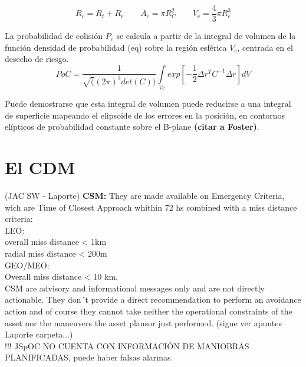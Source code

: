 \begin{equation}
R_{c}=R_{t}+R_{r} \qquad A_{c}=\pi R_{C}^{2} \qquad V_{c}=\frac{4}{3} \pi R_{c}^{3}
\end{equation}

La probabilidad de colisi\'on $P_{c}$ se calcula a partir de la integral de volumen de la funci\'on densidad de probabilidad (eq) sobre la regi\'on esf\'erica $V_{c}$, centrada en el desecho de riesgo.
\begin{equation}
PoC=\frac{1}{\sqrt((2\pi)^3det(C))} \int \limits_{Vc} exp[-\frac{1}{2}\Delta r^TC^{-1}\Delta r]dV
\end{equation}

Puede demostrarse que esta integral de volumen puede reducirse a una integral de superficie mapeando el elipsoide  de los errores en la posici\'on, en contornos el\'ipticos de probabilidad constante sobre el B-plane {\bf{(citar a Foster)}}.

\section{El CDM}
(JAC SW - Laporte)
{\bf{CSM:}} They are made available on Emergency Criteria, wich are Time of Closest Approach whithin 72 hs combined with a miss distance criteria:\\
LEO:\\
overall miss distance < 1km\\
radial miss distance < 200m\\
GEO/MEO:\\
Overall miss distance < 10 km.\\

CSM are advisory and informational messages only and are not directly actionable. They don´t provide a direct recommendation to perform an avoidance action and of course they cannot take neither the operational constraints of the asset nor the maneuvers the asset plansor just performed. (sigue ver apuntes Laporte carpeta...)\\

!!! JSpOC NO CUENTA CON INFORMACI\'ON DE MANIOBRAS PLANIFICADAS, puede haber falsas alarmas.\\




